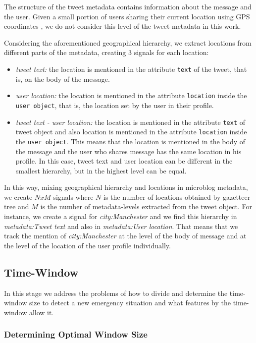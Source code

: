 \documentclass[sigconf]{acmart}
\begin{document}
The structure of the tweet metadata contains information about the message and the user. Given a small portion of users sharing their current location using GPS coordinates \cite{graham2014world}, we do not consider this level of the tweet metadata in this work. 

Considering the aforementioned geographical hierarchy, we extract locations from different parts of the metadata, creating 3 signals for each location:

\begin{itemize}
	\item {\it tweet text:} the location is mentioned in the attribute \texttt{text} of the tweet, that is, on the body of the message.
	\item {\it user location:} the location is mentioned in the attribute \texttt{location} inside the \texttt{user object}, that is, the location set by the user in their profile.
	\item {\it tweet text - user location:} the location is mentioned in the attribute \texttt{text} of tweet object and also location is mentioned in the attribute \texttt{location} inside the \texttt{user object}. This means that the location is mentioned in the body of the message and the user who shares message has the same location in his profile. In this case, tweet text and user location can be different in the smallest hierarchy, but in the highest level can be equal. 
\end{itemize}

In this way, mixing geographical hierarchy and locations in microblog metadata, we create $NxM$ signals where $N$ is the number of locations obtained by gazetteer tree and $M$ is the number of metadata-levels extracted from the tweet object. For instance, we create a signal for \textit{city:Manchester} and we find this hierarchy in \textit{metadata:Tweet text} and also in \textit{metadata:User location}. That means that we track the mention of \textit{city:Manchester} at the level of the body of message and at the level of the location of the user profile individually.

\subsection{Time-Window}
In this stage we address the problems of how to divide and determine the time-window size to detect a new emergency situation and what features by the time-window allow it.

\subsubsection{Determining Optimal Window Size}
\end{document}
